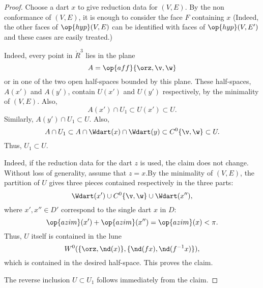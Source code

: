 \begin{proof}
  Choose a dart $x$ to give reduction data for $(V,E)$.  By the non
  conformance of $(V,E)$, it is enough to consider the face $F$
  containing $x$ (Indeed, the other faces of $\op{hyp}(V,E)$ can be
  identified with faces of $\op{hyp}(V,E')$ and these cases are easily
  treated.)  

Indeed,  every
  point in $\ring{R}^3$ lies in the plane
\begin{displaymath}
A=\op{aff}\{\orz,\v,\w\}
\end{displaymath}
or in one of the two open half-spaces bounded by this plane.  These
half-spaces, $A(x')$ and $A(y')$, contain $U(x')$ and $U(y')$
respectively, by the minimality of $(V,E)$.  Also,
\begin{displaymath}
A(x')\cap U_1 \subset U(x')\subset U.
\end{displaymath}
Similarly, $A(y')\cap U_1 \subset U$.  Also,
\begin{displaymath}
A \cap U_1 \subset A \cap \Wdart(x) \cap \Wdart(y) \subset C^0\{\v,\w\} \subset U.
\end{displaymath}
Thus,
$U_1\subset U$.

 Indeed,
if the reduction data for the dart $z$ is used, the claim does not change.
Without loss of generality, assume that $z=x$.By the minimality of $(V,E)$, the
partition  of $U$ gives three pieces contained respectively
in the three parts:
\begin{displaymath}
\Wdart(x') \cup C^0\{\v,\w\} \cup \Wdart(x''),
\end{displaymath}
where $x',x''\in D'$ correspond to the single dart $x$ in $D$:
\begin{displaymath}
\op{azim}(x') + \op{azim}(x'') = \op{azim}(x) < \pi.
\end{displaymath}
Thus, $U$ itself is contained in the lune
\begin{displaymath}
W^0(\{\orz,\nd(x)\},\{\nd(f x),\nd(f^{-1} x)\}),
\end{displaymath}
which is contained in the desired half-space.  This proves the claim.

The reverse inclusion $U\subset U_1$ follows immediately from the claim.
\end{proof}

%


